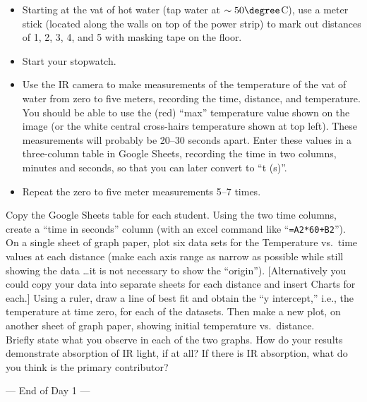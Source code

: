 \newpage

	\begin{itemize}
	\item Starting at the vat of hot water (tap water at $\sim 50\degree$C), use a meter stick (located along the walls on top of the power strip) to mark out  distances of \unit{1}{\meter}, \unit{2}{\meter}, \unit{3}{\meter}, \unit{4}{\meter}, and \unit{5}{\meter} with masking tape on the floor.
	\item Start your stopwatch.
	\item Use the IR camera to make measurements of the temperature of the vat of water from zero to five meters, recording the time, distance, and temperature. You should be able to use the (red) ``max'' temperature value shown on the image (or the white central cross-hairs temperature shown at top left).  These measurements will probably be 20--30 seconds apart. Enter these values in a three-column table in Google Sheets, recording the time in two columns, minutes and seconds, so that you can later convert to ``t (s)''.
	\item Repeat the zero to five meter measurements 5--7 times.
	\end{itemize}

 Copy the Google Sheets table for each student. Using the two time columns, create a ``time in seconds'' column (with an excel command like ``\verb|=A2*60+B2|'').  On a single sheet of graph paper, plot six data sets for the Temperature vs.\ time values at each distance (make each axis range as narrow as possible while still showing the data \ldots it is not necessary to show the ``origin'').  [Alternatively you could copy your data into separate sheets for each distance and insert Charts for each.]  Using a ruler, draw a line of best fit and obtain the ``y intercept,'' i.e., the temperature at time zero, for each of the datasets.  Then make a new plot, on another sheet of graph paper, showing initial temperature vs.\ distance.\\[-6pt]

\noindent Briefly state what you observe in each of the two graphs.  How do your results demonstrate absorption of IR light, if at all?  If there is IR absorption, what do you think is the primary contributor?

\answerspace

\vfill

--- End of Day 1 ---

\newpage


